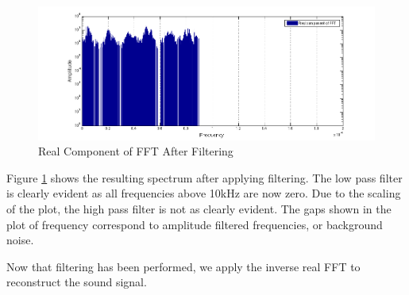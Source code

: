 \begin{figure}[H]
    \label{fig:afterFilt}
    \centering
        \includegraphics[width=6.5in]{./include/afterfig.png}
        \caption{Real Component of FFT After Filtering}
\end{figure}
Figure \ref{fig:afterFilt} shows the resulting spectrum after applying filtering. The low pass filter is clearly evident as all frequencies above 10kHz are now zero. Due to the scaling of the plot, the high pass filter is not as clearly evident. The gaps shown in the plot of frequency correspond to amplitude filtered frequencies, or background noise.

Now that filtering has been performed, we apply the inverse real FFT to reconstruct the sound signal.



